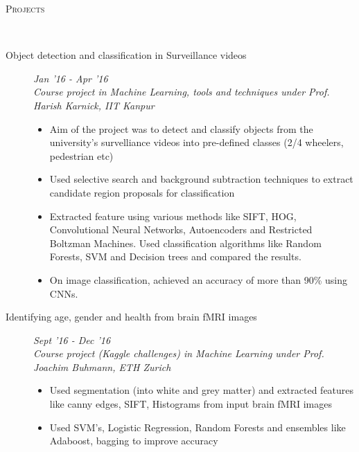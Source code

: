 \documentclass[9pt]{article}
\newenvironment{changemargin}[2]{%
  \begin{list}{}{%
    \setlength{\topsep}{0pt}%
    \setlength{\leftmargin}{#1}%
    \setlength{\rightmargin}{#2}%
    \setlength{\listparindent}{\parindent}%
    \setlength{\itemindent}{\parindent}%
    \setlength{\parsep}{\parskip}%
  }%
  \item[]}{\end{list}
}
\newcommand{\lineover}{
	\begin{changemargin}{-0.05in}{-0.10in}
		\vspace*{-9pt}
		\hrulefill \\
		\vspace*{-2pt}
	\end{changemargin}
}
\newcommand{\header}[1]{
	\begin{changemargin}{-0.5in}{-0.5in}
		\scshape{#1}\\
  	\lineover
	\end{changemargin}
}
\newenvironment{body} {
	\vspace*{-16pt}
	\begin{changemargin}{-0.6in}{-0.65in}
  }	
	{\end{changemargin}
}
\begin{document}
\header{Projects}
\begin{body}
	\vspace{14pt}
	
	\begin{description}
      
     \item[\normalsize{}] 
      
	 \item[\normalsize{Object detection and classification in Surveillance videos}] \hfill  \textit{Jan '16 - Apr '16} \\
	  \textit{Course project in Machine Learning, tools and techniques under Prof. Harish Karnick, IIT Kanpur}
	  \begin{itemize}
            \item Aim of the project was to detect and classify objects from the university's survelliance videos into 
                  pre-defined classes (2/4 wheelers, pedestrian etc)
            \item Used selective search and background subtraction techniques to extract candidate region proposals for classification
            \item Extracted feature using various methods like SIFT, HOG, Convolutional Neural Networks, Autoencoders and Restricted
                  Boltzman Machines. Used classification algorithms like Random Forests, SVM and Decision trees and compared the results.
            \item On image classification, achieved an accuracy of more than 90\% using CNNs.
	  \end{itemize}

	 \item[\normalsize{Identifying age, gender and health from brain fMRI images}] \hfill  \textit{Sept '16 - Dec '16} \\
           \textit{Course project (Kaggle challenges) in Machine Learning under Prof. Joachim Buhmann, ETH Zurich}
	  \begin{itemize}
            \item Used segmentation (into white and grey matter) and extracted features like canny edges, SIFT, Histograms 
              from input brain fMRI images
            \item Used SVM's, Logistic Regression, Random Forests and ensembles like Adaboost, bagging to improve accuracy
	  \end{itemize}


\end{description}
\end{body}
\end{document}

